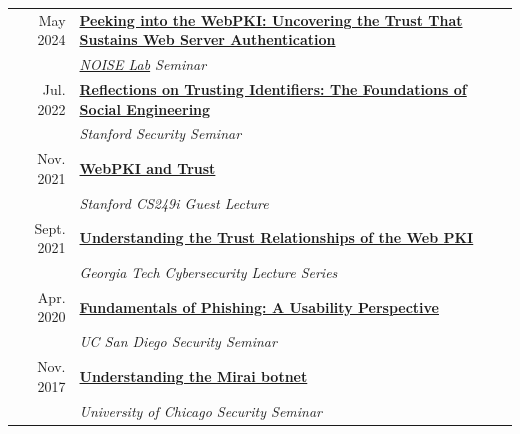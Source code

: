 \documentclass[10pt,singlecolumn]{article} %
\begin{document}
\begin{tabular}{rl}

May 2024 & \textbf{\href{}{Peeking into the WebPKI: Uncovering the Trust That Sustains Web Server Authentication}}\\
& \emph{\href{https://noise.cs.uchicago.edu/}{NOISE Lab} Seminar}\\    

Jul. 2022 & \textbf{\href{https://zanema.com/slides/stanford_se.pdf}{Reflections on Trusting Identifiers: The Foundations of Social Engineering}}\\
& \emph{Stanford Security Seminar}\\

Nov. 2021 & \textbf{\href{https://zanema.com/slides/CS249i-WebPKI.pdf}{WebPKI and Trust}}\\
& \emph{Stanford CS249i Guest Lecture}\\

Sept. 2021 & \textbf{\href{https://zanema.com/slides/gt_lecture_trust.pdf}{Understanding the Trust Relationships of the Web PKI}}\\
& \emph{Georgia Tech Cybersecurity Lecture Series}\\

Apr. 2020 & \textbf{\href{https://zanema.com/slides/ucsd_phishing.pdf}{Fundamentals of Phishing: A Usability Perspective}}\\
& \emph{UC San Diego Security Seminar}\\



Nov. 2017 & \textbf{\href{https://zanema.com/slides/uchicago_mirai.pdf}{Understanding the Mirai botnet}}\\
& \emph{University of Chicago Security Seminar}\\
\end{tabular} \\



\end{document}
